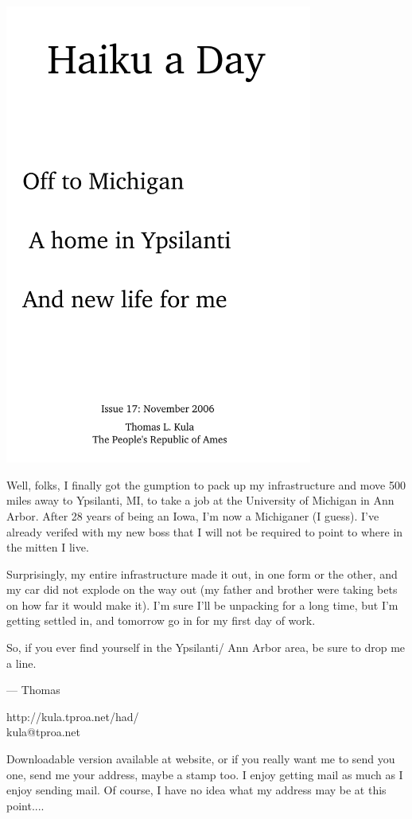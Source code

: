 \documentclass[12pt]{article}
\begin{document}
\includegraphics[width=101mm]{frontpage.png}

\newpage

Well, folks, I finally got the gumption to pack
up my infrastructure and move 500 miles away to
Ypsilanti, MI, to take a job at the University
of Michigan in Ann Arbor. After 28 years of
being an Iowa, I'm now a Michiganer (I guess).
I've already verifed with my new boss that I will
not be required to point to where in the mitten
I live.

Surprisingly, my entire infrastructure made it
out, in one form or the other, and my car did
not explode on the way out (my father and brother
were taking bets on how far it would make it).
I'm sure I'll be unpacking for a long time, but
I'm getting settled in, and tomorrow go in for 
my first day of work.

So, if you ever find yourself in the Ypsilanti/
Ann Arbor area, be sure to drop me a line.


--- Thomas

http://kula.tproa.net/had/ \\
kula@tproa.net

Downloadable version available at website, or if you really
want me to send you one, send me your address, maybe a
stamp too. I enjoy getting mail as much as I enjoy sending
mail. Of course, I have no idea what my address may be at
this point....
\end{document}

